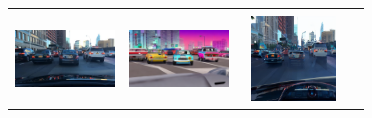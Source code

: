 \documentclass{VUMIFPSbakalaurinis}
\begin{document}
\begin{table}[H]
{\begin{tabular}{|c|c|c|c|}
            \hline
            \\
            \includegraphics[width=100,height=85]{img/original/7c0a7d5a-da928c23} & 
            \includegraphics[width=100,height=85]{img/diffusion/controlnet/7c0a7d5a-da928c23} & 
            \includegraphics[width=100,height=85]{img/diffusion/cycle/7c0a7d5a-da928c23} & 

\end{tabular}}
\end{table}
\end{document}

